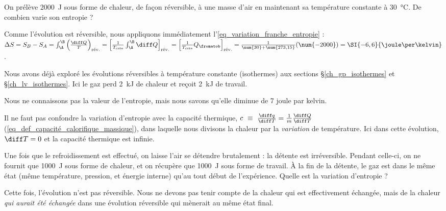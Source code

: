 		\begin{anexample}
		\label{exemple_delta_entropie_basics}
			On prélève \SI{2000}{\joule} sous forme de chaleur, de façon réversible, à une masse d’air en maintenant sa température constante à \SI{30}{\degreeCelsius}. De combien varie son entropie ?
				\begin{answer}
					Comme l’évolution est réversible, nous appliquons immédiatement l’\cref{eq_variation_franche_entropie} : $\Delta S 
						= S_B - S_A
						= \int_\A^\B \left( \frac{\diff Q}{T} \right)_\text{rév.} 
						= \left[\frac{1}{T_\text{cste}} \int_\A^\B \diff Q \right]_\text{rév.}
						= \left[\frac{1}{T_\text{cste}} Q_\fromatob \right]_\text{rév.}
						= \frac{1}{\num{30} + \num{273,15}} (\num{-2000})
						= \SI{-6,6}{\joule\per\kelvin}$.
					\begin{remark}Nous avons déjà exploré les évolutions réversibles à température constante (isothermes) aux sections \S\ref{ch_gp_isothermes} et \S\ref{ch_lv_isothermes}. Ici le gaz perd \SI{2}{\kilo\joule} de chaleur et reçoit \SI{2}{\kilo\joule} de travail.\end{remark}
					\begin{remark}Nous ne connaissons pas la valeur de l’entropie, mais nous savons qu’elle diminue de 7 \si{joule} par \si{kelvin}.\end{remark}
					\begin{remark}Il ne faut pas confondre la variation d’entropie avec la capacité thermique, $c\ \equiv \ \frac{\diff q}{\diff T} = \frac{1}{m} \frac{\diff Q}{\diff T}$ (\ref{eq_def_capacité_calorifique_massique}), dans laquelle nous divisons la chaleur par la \emph{variation} de température. Ici dans cette évolution, $\diff T = 0$ et la capacité thermique est infinie.\end{remark}
				\end{answer}
			
			Une fois que le refroidissement est effectué, on laisse l’air se détendre brutalement : la détente est irréversible. Pendant celle-ci, on ne fournit que \SI{1000}{\joule} sous forme de chaleur, et on récupère que \SI{1000}{\joule} sous forme de travail. À la fin de la détente, le gaz est dans le même état (même température, pression, et énergie interne) qu’au tout début de l’expérience. Quelle est la variation d’entropie ?
				\begin{answer} Cette fois, l’évolution n’est pas réversible. Nous ne devons pas tenir compte de la chaleur qui est effectivement échangée, mais de la chaleur \emph{qui aurait été échangée} dans une évolution réversible qui mènerait au même état final.
				

\end{answer}
\end{anexample}
